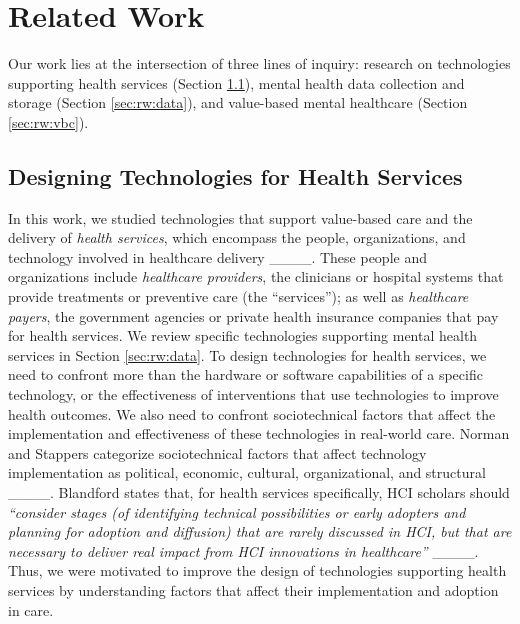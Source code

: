 \section{Related Work}
\label{sec:rw}

Our work lies at the intersection of three lines of inquiry: research on technologies supporting health services (Section \ref{sec:rw:tech-services}), mental health data collection and storage (Section \ref{sec:rw:data}), and value-based mental healthcare (Section \ref{sec:rw:vbc}).

\subsection{Designing Technologies for Health Services}
\label{sec:rw:tech-services}

In this work, we studied technologies that support value-based care and the delivery of \textit{health services}, which encompass the people, organizations, and technology involved in healthcare delivery ____.
These people and organizations include \textit{healthcare providers}, the clinicians or hospital systems that provide treatments or preventive care (the ``services''); as well as \textit{healthcare payers}, the government agencies or private health insurance companies that pay for health services.
We review specific technologies supporting mental health services in Section \ref{sec:rw:data}.
To design technologies for health services, we need to confront more than the hardware or software capabilities of a specific technology, or the effectiveness of interventions that use technologies to improve health outcomes.
We also need to confront sociotechnical factors that affect the implementation and effectiveness of these technologies in real-world care. 
Norman and Stappers categorize sociotechnical factors that affect technology implementation as political, economic, cultural, organizational, and structural ____.
Blandford states that, for health services specifically, HCI scholars should \textit{``consider stages (of identifying technical possibilities or early adopters and planning for adoption and diffusion) that are rarely discussed in HCI, but that are necessary to deliver real impact from HCI innovations in healthcare''} ____.
Thus, we were motivated to improve the design of technologies supporting health services by understanding factors that affect their implementation and adoption in care.

